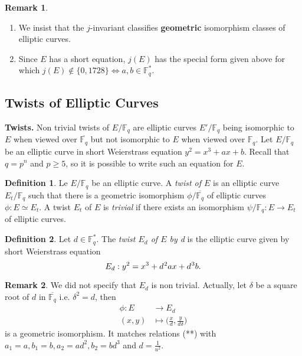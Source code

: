 \documentclass[10pt]{article}
\theoremstyle{definition}
\newtheorem{definition}{Definition}
\newtheorem{remark}{Remark}
\newcommand{\F}{\mathbb{F}}
\begin{document}
\noindent \begin{remark}
\begin{enumerate}
\item We insist that the $j$-invariant classifies \textbf{geometric} isomorphism classes of elliptic curves. 
\item Since $E$ has a short equation, $j(E)$ has the special form given above for which $j(E) \notin \lbrace 0, 1728 \rbrace \Leftrightarrow a,b \in \F_q^{*}$.
\end{enumerate}
\end{remark}

\subsection{Twists of Elliptic Curves}

\noindent \textbf{Twists.} Non trivial twists of $E/\F_q$ are elliptic curves $E'/\F_q$ being isomorphic to $E$ when viewed over $\overline{\F_q}$ but not isomorphic to $E$ when viewed over $\F_q$.
Let $E/\F_q$ be an elliptic curve in short Weierstrass equation $y^2 = x^3+ax+b$.
Recall that $q = p^n$ and $p \geq 5$, so it is possible to write such an equation for $E$. 

\begin{definition}
Le $E/\F_q$ be an elliptic curve.
A \textsl{twist of $E$} is an elliptic curve $E_t/\F_q$ such that there is a geometric isomorphism $\phi/\overline{\F_q}$ of elliptic curves $\phi : E \simeq E_t$.
A twist $E_t$ of $E$ is \textsl{trivial} if there exists an isomorphism $\psi/\F_q : E \to E_t$ of elliptic curves. 
\end{definition}

\begin{definition}
Let $d \in \F_q^*$.
The \textsl{twist $E_d$ of $E$ by d} is the elliptic curve given by short Weierstrass equation
\[ E_d : y^2 = x^3 + d^{\mkern1mu 2}ax + d^{\mkern1mu 3}b.\]
\end{definition}

\begin{remark}
We did not specify that $E_d$ is non trivial.
Actually, let $\delta$ be a square root of $d$ in $\overline{\F_q}$ i.e. $\delta^2 = d$, then
\begin{align*}
\phi : E & \to E_d\\
      (x,y)& \mapsto \big(\frac{x}{d},\frac{y}{d\delta}\big)
\end{align*}
is a geometric isomorphism. 
It matches relations (**) with $a_1=a, b_1=b, a_2 = ad^2, b_2=bd^3$ and $d = \frac{1}{u^2}$.
\end{remark}
\end{document}
